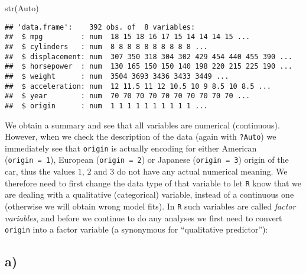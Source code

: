\documentclass[
]{article}
\newenvironment{Shaded}{\begin{snugshade}}{\end{snugshade}}
\newcommand{\FunctionTok}[1]{\textcolor[rgb]{0.00,0.00,0.00}{#1}}
\newcommand{\NormalTok}[1]{#1}
\newcommand{\OtherTok}[1]{\textcolor[rgb]{0.56,0.35,0.01}{#1}}
\newcommand{\SpecialCharTok}[1]{\textcolor[rgb]{0.00,0.00,0.00}{#1}}
\begin{document}
\begin{Shaded}
\begin{Highlighting}[]
\FunctionTok{str}\NormalTok{(Auto)}
\end{Highlighting}
\end{Shaded}

\begin{verbatim}
## 'data.frame':    392 obs. of  8 variables:
##  $ mpg         : num  18 15 18 16 17 15 14 14 14 15 ...
##  $ cylinders   : num  8 8 8 8 8 8 8 8 8 8 ...
##  $ displacement: num  307 350 318 304 302 429 454 440 455 390 ...
##  $ horsepower  : num  130 165 150 150 140 198 220 215 225 190 ...
##  $ weight      : num  3504 3693 3436 3433 3449 ...
##  $ acceleration: num  12 11.5 11 12 10.5 10 9 8.5 10 8.5 ...
##  $ year        : num  70 70 70 70 70 70 70 70 70 70 ...
##  $ origin      : num  1 1 1 1 1 1 1 1 1 1 ...
\end{verbatim}

We obtain a summary and see that all variables are numerical
(continuous). However, when we check the description of the data (again
with \texttt{?Auto}) we immediately see that \texttt{origin} is actually
encoding for either American (\texttt{origin\ =\ 1}), European
(\texttt{origin\ =\ 2}) or Japanese (\texttt{origin\ =\ 3}) origin of
the car, thus the values \(1\), \(2\) and \(3\) do not have any actual
numerical meaning. We therefore need to first change the data type of
that variable to let \texttt{R} know that we are dealing with a
qualitative (categorical) variable, instead of a continuous one
(otherwise we will obtain wrong model fits). In \texttt{R} such
variables are called \emph{factor variables}, and before we continue to
do any analyses we first need to convert \texttt{origin} into a factor
variable (a synonymous for ``qualitative predictor''):

\begin{Shaded}
\end{Shaded}

\hypertarget{a}{%
\subsection{a)}\label{a}}
\end{document}
